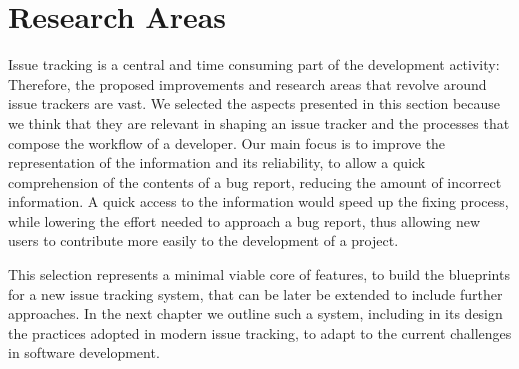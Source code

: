 \section{Research Areas}

Issue tracking is a central and time consuming part of the development activity: Therefore, the proposed improvements and research areas that revolve around issue trackers are vast.
We selected the aspects presented in this section because we think that they are relevant in shaping an issue tracker and the processes that compose the workflow of a developer. Our main focus is to improve the representation of the information and its reliability, to allow a quick comprehension of the contents of a bug report, reducing the amount of incorrect information. A quick access to the information would speed up the fixing process, while lowering the effort needed to approach a bug report, thus allowing new users to contribute more easily to the development of a project.

This selection represents a minimal viable core of features, to build the blueprints for a new issue tracking system, that can be later be extended to include further approaches. In the next chapter we outline such a system, including in its design the practices adopted in modern issue tracking, to adapt to the current challenges in software development.
